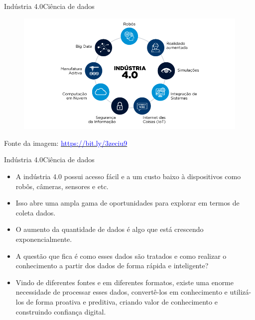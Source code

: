 \documentclass[t]{beamer}
\begin{document}
\begin{ftst}{Indústria 4.0}{Ciência de dados}

\begin{figure}
    \centering
    \includegraphics[scale=0.4]{Figuras/slide00_02.png}
\end{figure}
\vone
\vone
\scriptsize
Fonte da imagem: \href{https://bit.ly/2XHP0Pg}{\textcolor{blue}{https://bit.ly/3zeciu9}}
\end{ftst}


\begin{ftst}{Indústria 4.0}{Ciência de dados}

\begin{itemize}
    \item A indústria 4.0 possui acesso fácil e a um custo baixo à dispositivos como robôs, câmeras, sensores e etc.
    \item Isso abre uma ampla gama de oportunidades para explorar em termos de coleta dados.
    \item O aumento da quantidade de dados é algo que está crescendo exponencialmente. \item A questão que fica é como esses dados são tratados e como realizar o conhecimento a partir dos dados de forma rápida e inteligente?
    \item Vindo de diferentes fontes e em diferentes formatos, existe uma enorme necessidade de processar esses dados, convertê-los em conhecimento e utilizá-los de forma proativa e preditiva, criando valor de conhecimento e construindo confiança digital.
\end{itemize}
\end{ftst}

\end{document}
